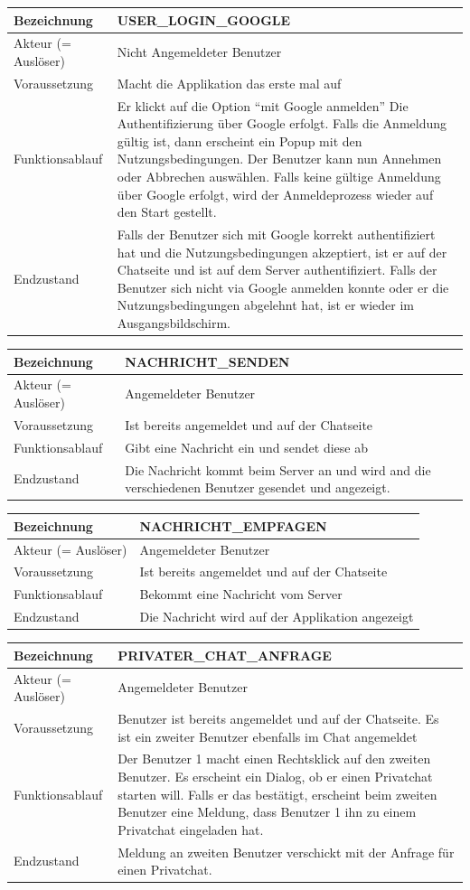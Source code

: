 \documentclass[12pt]{article}
\newcommand{\requirementTable}[5]{
    \begin{table}[H]
      \begin{tabularx}{\textwidth}{|l|X|}
        \hline
        Bezeichnung & #1  \\ \hline
        Akteur (= Auslöser) & #2  \\ \hline
        Voraussetzung & #3  \\ \hline
        Funktionsablauf & #4  \\ \hline
        Endzustand & #5  \\ \hline
      \end{tabularx}
    \end{table}
}
\begin{document}
        \requirementTable
            {USER\_LOGIN\_GOOGLE}
            {Nicht Angemeldeter Benutzer}
            {Macht die Applikation das erste mal auf}
            {
            Er klickt auf die Option “mit Google anmelden” \newline
            Die Authentifizierung über Google erfolgt. \newline
            Falls die Anmeldung gültig ist, dann erscheint ein Popup mit den Nutzungsbedingungen. Der Benutzer kann nun Annehmen oder Abbrechen auswählen. \newline
            Falls keine gültige Anmeldung über Google erfolgt, wird der Anmeldeprozess wieder auf den Start gestellt.
            }
            {
            Falls der Benutzer sich mit Google korrekt authentifiziert hat und  die Nutzungsbedingungen akzeptiert, ist er auf der Chatseite und ist auf dem Server authentifiziert. \newline
            Falls der Benutzer sich nicht via Google anmelden konnte oder er die Nutzungsbedingungen abgelehnt hat, ist er wieder im Ausgangsbildschirm.
            }
            
        \requirementTable
            {NACHRICHT\_SENDEN}
            {Angemeldeter Benutzer}
            {Ist bereits angemeldet und auf der Chatseite}
            {Gibt eine Nachricht ein und sendet diese ab}
            {Die Nachricht kommt beim Server an und wird and die verschiedenen Benutzer gesendet und angezeigt.}
            
        \requirementTable
            {NACHRICHT\_EMPFAGEN}
            {Angemeldeter Benutzer}
            {Ist bereits angemeldet und auf der Chatseite}
            {Bekommt eine Nachricht vom Server}
            {Die Nachricht wird auf der Applikation angezeigt}
            
                   
        \requirementTable
            {PRIVATER\_CHAT\_ANFRAGE}
            {Angemeldeter Benutzer}
            {
            Benutzer ist bereits angemeldet und auf der Chatseite. \newline
            Es ist ein zweiter Benutzer ebenfalls im Chat angemeldet
            }
            {
            Der Benutzer 1 macht einen Rechtsklick auf den zweiten Benutzer. \newline
            Es erscheint ein Dialog, ob er einen Privatchat starten will. \newline
            Falls er das bestätigt, erscheint beim zweiten Benutzer eine Meldung, dass Benutzer 1 ihn zu einem Privatchat eingeladen hat.
            }
            {Meldung an zweiten Benutzer verschickt mit der Anfrage für einen Privatchat.}
            
\end{document}
